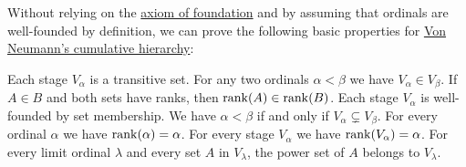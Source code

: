 \begin{proposition}\label{thm:def:cumulative_hierarchy}
  Without relying on the \hyperref[def:zfc/foundation]{axiom of foundation} and by assuming that ordinals are well-founded by definition, we can prove the following basic properties for \hyperref[def:cumulative_hierarchy]{Von Neumann's cumulative hierarchy}:
  \begin{thmenum}
     Each stage \( V_\alpha \) is a transitive set.
     For any two ordinals \( \alpha < \beta \) we have \( V_\alpha \in V_\beta \).
     If \( A \in B \) and both sets have ranks, then \( \operatorname{rank}(A) \in \operatorname{rank}(B) \).
     Each stage \( V_\alpha \) is well-founded by set membership.
     We have \( \alpha < \beta \) if and only if \( V_\alpha \subsetneq V_\beta \).
     For every ordinal \( \alpha \) we have \( \operatorname{rank}(\alpha) = \alpha \).
     For every stage \( V_\alpha \) we have \( \operatorname{rank}(V_\alpha) = \alpha \).
     For every limit ordinal \( \lambda \) and every set \( A \) in \( V_\lambda \), the power set of \( A \) belongs to \( V_\lambda \).
  \end{thmenum}
\end{proposition}
